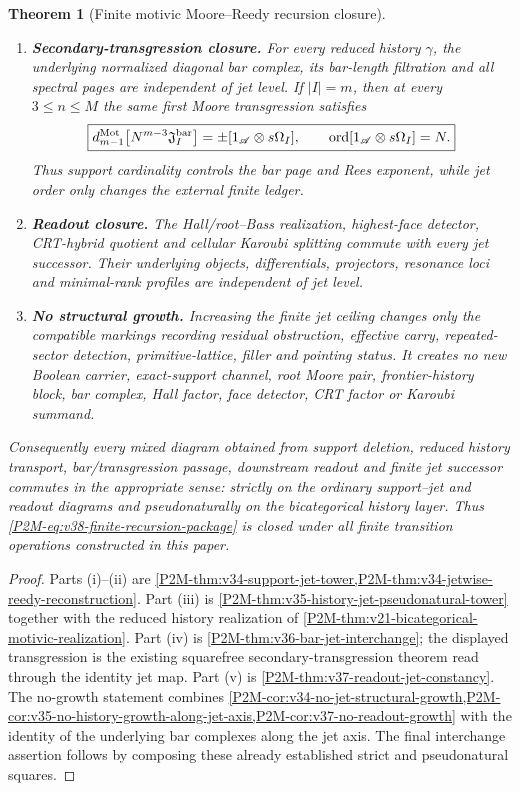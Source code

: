 \documentclass[11pt]{article}
\newtheorem{theorem}{Theorem}[section]
\theoremstyle{remark}
\newcommand{\Mot}{\mathrm{Mot}}
\newcommand{\ord}{\operatorname{ord}}
\begin{document}
\begin{theorem}[Finite motivic Moore--Reedy recursion closure]
\begin{enumerate}[label=\textup{(\roman*)}]
\item \textbf{Secondary-transgression closure.}
For every reduced history $\gamma$, the underlying normalized diagonal bar
complex, its bar-length filtration and all spectral pages are independent of
jet level.  If $|I|=m$, then at every $3\le n\le M$ the same first Moore
transgression satisfies
\begin{equation}\label{P2M-eq:v38-jet-constant-secondary-transgression}
 \boxed{
 d_{m-1}^{\Mot}
 \bigl[N^{m-3}\mathfrak J_I^{\rm bar}\bigr]
 =\pm[1_{\mathscr A}\otimes s\Omega_I],
 \qquad
 \ord[1_{\mathscr A}\otimes s\Omega_I]=N.}
\end{equation}
Thus support cardinality controls the bar page and Rees exponent, while jet
order only changes the external finite ledger.

\item \textbf{Readout closure.}
The Hall/root--Bass realization, highest-face detector, CRT-hybrid quotient and
cellular Karoubi splitting commute with every jet successor.  Their underlying
objects, differentials, projectors, resonance loci and minimal-rank profiles
are independent of jet level.

\item \textbf{No structural growth.}
Increasing the finite jet ceiling changes only the compatible markings
recording residual obstruction, effective carry, repeated-sector detection,
primitive-lattice, filler and pointing status.  It creates no new Boolean
carrier, exact-support channel, root Moore pair, frontier-history block, bar
complex, Hall factor, face detector, CRT factor or Karoubi summand.
\end{enumerate}
Consequently every mixed diagram obtained from support deletion, reduced
history transport, bar/transgression passage, downstream readout and finite
jet successor commutes in the appropriate sense: strictly on the ordinary
support--jet and readout diagrams and pseudonaturally on the bicategorical
history layer.  Thus \eqref{P2M-eq:v38-finite-recursion-package} is closed under all
finite transition operations constructed in this paper.
\end{theorem}

\begin{proof}
Parts \textup{(i)--(ii)} are
\cref{P2M-thm:v34-support-jet-tower,P2M-thm:v34-jetwise-reedy-reconstruction}.
Part \textup{(iii)} is
\cref{P2M-thm:v35-history-jet-pseudonatural-tower} together with the reduced
history realization of \cref{P2M-thm:v21-bicategorical-motivic-realization}.
Part \textup{(iv)} is \cref{P2M-thm:v36-bar-jet-interchange}; the displayed
transgression is the existing squarefree secondary-transgression theorem read
through the identity jet map.  Part \textup{(v)} is
\cref{P2M-thm:v37-readout-jet-constancy}.  The no-growth statement combines
\cref{P2M-cor:v34-no-jet-structural-growth,P2M-cor:v35-no-history-growth-along-jet-axis,P2M-cor:v37-no-readout-growth}
with the identity of the underlying bar complexes along the jet axis.  The
final interchange assertion follows by composing these already established
strict and pseudonatural squares.
\end{proof}
\end{document}
